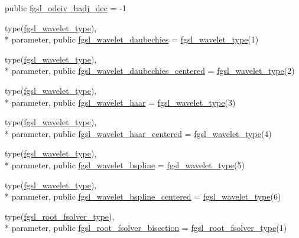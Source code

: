 \begin{DoxyCompactItemize}
public \hyperlink{classfgsl_a2325b2b4a96fc162d6be916e21d71bb0}{fgsl\-\_\-odeiv\-\_\-hadj\-\_\-dec} = -\/1
\item 
type(\hyperlink{structfgsl_1_1fgsl__wavelet__type}{fgsl\-\_\-wavelet\-\_\-type}), \\*
parameter, public \hyperlink{classfgsl_a67c3173fcd7991624114d64eb31bf6d8}{fgsl\-\_\-wavelet\-\_\-daubechies} = \hyperlink{structfgsl_1_1fgsl__wavelet__type}{fgsl\-\_\-wavelet\-\_\-type}(1)
\item 
type(\hyperlink{structfgsl_1_1fgsl__wavelet__type}{fgsl\-\_\-wavelet\-\_\-type}), \\*
parameter, public \hyperlink{classfgsl_a26df4eaadbaa474bae2dca6abdaea27f}{fgsl\-\_\-wavelet\-\_\-daubechies\-\_\-centered} = \hyperlink{structfgsl_1_1fgsl__wavelet__type}{fgsl\-\_\-wavelet\-\_\-type}(2)
\item 
type(\hyperlink{structfgsl_1_1fgsl__wavelet__type}{fgsl\-\_\-wavelet\-\_\-type}), \\*
parameter, public \hyperlink{classfgsl_a416323050493f1845d764b5bf3599477}{fgsl\-\_\-wavelet\-\_\-haar} = \hyperlink{structfgsl_1_1fgsl__wavelet__type}{fgsl\-\_\-wavelet\-\_\-type}(3)
\item 
type(\hyperlink{structfgsl_1_1fgsl__wavelet__type}{fgsl\-\_\-wavelet\-\_\-type}), \\*
parameter, public \hyperlink{classfgsl_a98a440f78f036ed2b35f84992ba0db82}{fgsl\-\_\-wavelet\-\_\-haar\-\_\-centered} = \hyperlink{structfgsl_1_1fgsl__wavelet__type}{fgsl\-\_\-wavelet\-\_\-type}(4)
\item 
type(\hyperlink{structfgsl_1_1fgsl__wavelet__type}{fgsl\-\_\-wavelet\-\_\-type}), \\*
parameter, public \hyperlink{classfgsl_a6fb8d8501c5f52d65dd32be21f7a8431}{fgsl\-\_\-wavelet\-\_\-bspline} = \hyperlink{structfgsl_1_1fgsl__wavelet__type}{fgsl\-\_\-wavelet\-\_\-type}(5)
\item 
type(\hyperlink{structfgsl_1_1fgsl__wavelet__type}{fgsl\-\_\-wavelet\-\_\-type}), \\*
parameter, public \hyperlink{classfgsl_a61c7f4e05d439d135784a3d84e7f9b3a}{fgsl\-\_\-wavelet\-\_\-bspline\-\_\-centered} = \hyperlink{structfgsl_1_1fgsl__wavelet__type}{fgsl\-\_\-wavelet\-\_\-type}(6)
\item 
type(\hyperlink{structfgsl_1_1fgsl__root__fsolver__type}{fgsl\-\_\-root\-\_\-fsolver\-\_\-type}), \\*
parameter, public \hyperlink{classfgsl_aa7dc27fd2c5eda5bdd57f4936c041faf}{fgsl\-\_\-root\-\_\-fsolver\-\_\-bisection} = \hyperlink{structfgsl_1_1fgsl__root__fsolver__type}{fgsl\-\_\-root\-\_\-fsolver\-\_\-type}(1)

\end{DoxyCompactItemize}
